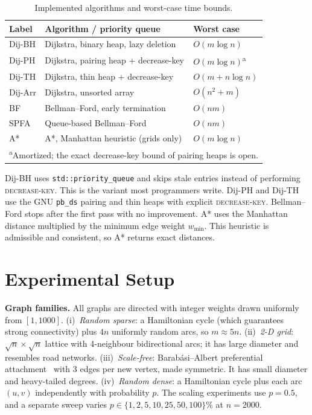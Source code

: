 \documentclass[conference]{IEEEtran}
\begin{document}
\begin{table}[t]
\centering
\caption{Implemented algorithms and worst-case time bounds.}
\label{tab:algos}
\footnotesize
\begin{tabular}{lll}
\toprule
Label & Algorithm / priority queue & Worst case \\
\midrule
Dij-BH  & Dijkstra, binary heap, lazy deletion & $O(m\log n)$ \\
Dij-PH  & Dijkstra, pairing heap + decrease-key & $O(m\log n)$\textsuperscript{a} \\
Dij-TH  & Dijkstra, thin heap + decrease-key & $O(m + n\log n)$ \\
Dij-Arr & Dijkstra, unsorted array & $O(n^2 + m)$ \\
BF      & Bellman--Ford, early termination & $O(nm)$ \\
SPFA    & Queue-based Bellman--Ford & $O(nm)$ \\
A*      & A*, Manhattan heuristic (grids only) & $O(m\log n)$ \\
\bottomrule
\multicolumn{3}{l}{\scriptsize \textsuperscript{a}Amortized; the exact decrease-key bound of pairing heaps is open.}
\end{tabular}
\end{table}

Dij-BH uses \texttt{std::priority\_queue} and skips stale entries instead of
performing \textsc{decrease-key}. This is the variant most programmers write.
Dij-PH and Dij-TH use the GNU \texttt{pb\_ds} pairing and thin heaps with
explicit \textsc{decrease-key}. Bellman--Ford stops after the first pass with no
improvement. A* uses the Manhattan distance multiplied by the minimum edge weight
$w_{\min}$. This heuristic is admissible and consistent, so A* returns exact
distances.

\section{Experimental Setup}
\label{sec:setup}

\textbf{Graph families.} All graphs are directed with integer weights drawn
uniformly from $[1,1000]$.
(i)~\emph{Random sparse}: a Hamiltonian cycle (which guarantees strong
connectivity) plus $4n$ uniformly random arcs, so $m\approx 5n$.
(ii)~\emph{2-D grid}: $\sqrt n\times\sqrt n$ lattice with 4-neighbour
bidirectional arcs; it has large diameter and resembles road networks.
(iii)~\emph{Scale-free}: Barab\'asi--Albert preferential
attachment~\cite{barabasi1999} with 3 edges per new vertex, made symmetric.
It has small diameter and heavy-tailed degrees.
(iv)~\emph{Random dense}: a Hamiltonian cycle plus each arc $(u,v)$
independently with probability $p$. The scaling experiments use $p=0.5$, and a
separate sweep varies $p\in\{1,2,5,10,25,50,100\}\%$ at $n=2000$.
\end{document}
